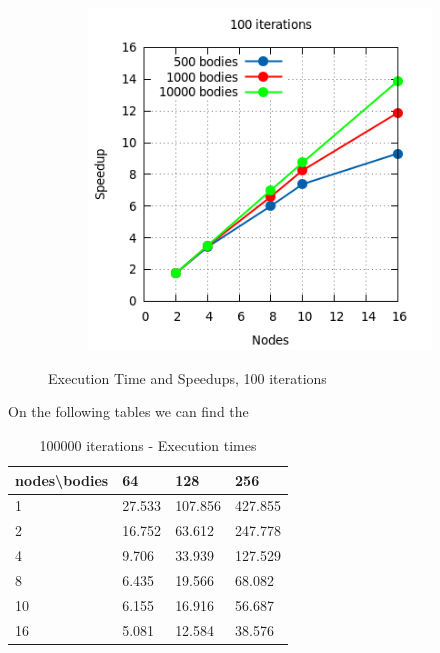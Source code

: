 \documentclass[a4paper]{article}
\begin{document}
\begin{figure}[ht]
\begin{subfigure}{.5\textwidth}
\end{subfigure} %
\begin{subfigure}{.5\textwidth}
  \centering
  \includegraphics[width=1\linewidth]{results/graph16}
\end{subfigure} 
  \caption{Execution Time and Speedups, 100 iterations}
  \label{fig:R2}
\end{figure}
\FloatBarrier

On the following tables we can find the 
		
\begin{table}[]
\centering
\caption{100000 iterations - Execution times}
\label{t5}
\begin{tabular}{l|l|l|l}
nodes\textbackslash bodies & 64 & 128 & 256 \\ \hline
1 & 27.533 & 107.856 & 427.855 \\ \hline
2 & 16.752 & 63.612 & 247.778 \\ \hline
4 & 9.706 & 33.939 & 127.529 \\ \hline
8 & 6.435 & 19.566 & 68.082 \\ \hline
10 & 6.155 & 16.916 & 56.687 \\ \hline
16 & 5.081 & 12.584 & 38.576 \\ \hline
\end{tabular}
\end{table}
\end{document}
